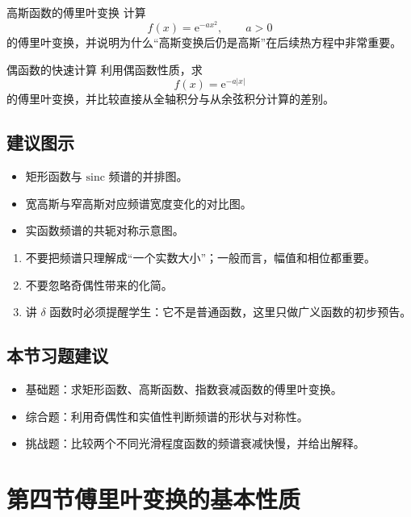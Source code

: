 \begin{lizi}{高斯函数的傅里叶变换}{}
计算
\[
    f(x)=\mathrm{e}^{-ax^2}, \qquad a>0
\]
的傅里叶变换，并说明为什么``高斯变换后仍是高斯''在后续热方程中非常重要。
\end{lizi}

\begin{lizi}{偶函数的快速计算}{}
利用偶函数性质，求
\[
    f(x)=\mathrm{e}^{-a|x|}
\]
的傅里叶变换，并比较直接从全轴积分与从余弦积分计算的差别。
\end{lizi}

\subsection*{建议图示}
\begin{itemize}
    \item 矩形函数与 $\mathrm{sinc}$ 频谱的并排图。
    \item 宽高斯与窄高斯对应频谱宽度变化的对比图。
    \item 实函数频谱的共轭对称示意图。
\end{itemize}

\begin{jinshi}[本节易错点]
\begin{enumerate}
    \item 不要把频谱只理解成``一个实数大小''；一般而言，幅值和相位都重要。
    \item 不要忽略奇偶性带来的化简。
    \item 讲 $\delta$ 函数时必须提醒学生：它不是普通函数，这里只做广义函数的初步预告。
\end{enumerate}
\end{jinshi}

\subsection*{本节习题建议}
\begin{itemize}
    \item 基础题：求矩形函数、高斯函数、指数衰减函数的傅里叶变换。
    \item 综合题：利用奇偶性和实值性判断频谱的形状与对称性。
    \item 挑战题：比较两个不同光滑程度函数的频谱衰减快慢，并给出解释。
\end{itemize}

\section{第四节\quad 傅里叶变换的基本性质}

